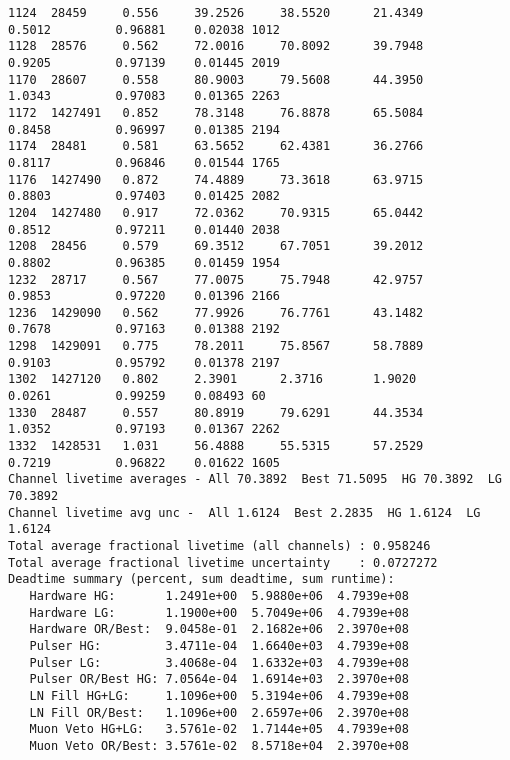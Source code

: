 \documentclass[notitlepage,rmp,aps,10pt]{revtex4-1}
\begin{document}
\begin{verbatim}
1124  28459     0.556     39.2526     38.5520      21.4349        0.5012         0.96881    0.02038 1012
1128  28576     0.562     72.0016     70.8092      39.7948        0.9205         0.97139    0.01445 2019
1170  28607     0.558     80.9003     79.5608      44.3950        1.0343         0.97083    0.01365 2263
1172  1427491   0.852     78.3148     76.8878      65.5084        0.8458         0.96997    0.01385 2194
1174  28481     0.581     63.5652     62.4381      36.2766        0.8117         0.96846    0.01544 1765
1176  1427490   0.872     74.4889     73.3618      63.9715        0.8803         0.97403    0.01425 2082
1204  1427480   0.917     72.0362     70.9315      65.0442        0.8512         0.97211    0.01440 2038
1208  28456     0.579     69.3512     67.7051      39.2012        0.8802         0.96385    0.01459 1954
1232  28717     0.567     77.0075     75.7948      42.9757        0.9853         0.97220    0.01396 2166
1236  1429090   0.562     77.9926     76.7761      43.1482        0.7678         0.97163    0.01388 2192
1298  1429091   0.775     78.2011     75.8567      58.7889        0.9103         0.95792    0.01378 2197
1302  1427120   0.802     2.3901      2.3716       1.9020         0.0261         0.99259    0.08493 60
1330  28487     0.557     80.8919     79.6291      44.3534        1.0352         0.97193    0.01367 2262
1332  1428531   1.031     56.4888     55.5315      57.2529        0.7219         0.96822    0.01622 1605
Channel livetime averages - All 70.3892  Best 71.5095  HG 70.3892  LG 70.3892
Channel livetime avg unc -  All 1.6124  Best 2.2835  HG 1.6124  LG 1.6124
Total average fractional livetime (all channels) : 0.958246
Total average fractional livetime uncertainty    : 0.0727272
Deadtime summary (percent, sum deadtime, sum runtime):
   Hardware HG:       1.2491e+00  5.9880e+06  4.7939e+08
   Hardware LG:       1.1900e+00  5.7049e+06  4.7939e+08
   Hardware OR/Best:  9.0458e-01  2.1682e+06  2.3970e+08
   Pulser HG:         3.4711e-04  1.6640e+03  4.7939e+08
   Pulser LG:         3.4068e-04  1.6332e+03  4.7939e+08
   Pulser OR/Best HG: 7.0564e-04  1.6914e+03  2.3970e+08
   LN Fill HG+LG:     1.1096e+00  5.3194e+06  4.7939e+08
   LN Fill OR/Best:   1.1096e+00  2.6597e+06  2.3970e+08
   Muon Veto HG+LG:   3.5761e-02  1.7144e+05  4.7939e+08
   Muon Veto OR/Best: 3.5761e-02  8.5718e+04  2.3970e+08


\end{verbatim}
\end{document}
